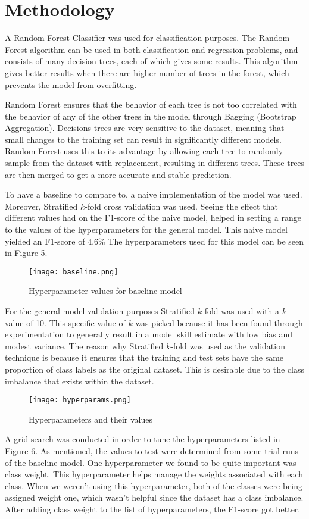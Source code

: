 \documentclass[conference]{IEEEtran}
\begin{document}
\section{Methodology}
A Random Forest Classifier was used for classification purposes. The Random Forest algorithm can be used in both classification and regression problems, and consists of many decision trees, each of which gives some results. This algorithm gives better results when there are higher number of trees in the forest, which prevents the model from overfitting.  

Random Forest ensures that the behavior of each tree is not too correlated with the behavior of any of the other trees in the model through Bagging (Bootstrap Aggregation). Decisions trees are very sensitive to the dataset, meaning that small changes to the training set can result in significantly different models. Random Forest uses this to its advantage by allowing each tree to randomly sample from the dataset with replacement, resulting in different trees. These trees are then merged to get a more accurate and stable prediction.


To have a baseline to compare to, a naive implementation of the model was used. Moreover, Stratified $k$-fold cross validation was used. Seeing the effect that different values had on the F1-score of the naive model, helped in setting a range to the values of the hyperparameters for the general model. This naive model yielded an F1-score of 4.6\% The hyperparameters used for this model can be seen in Figure 5.
\begin{figure}[hbt!]
\centering
\texttt{[image: baseline.png]}
\caption{Hyperparameter values for baseline model\label{overflow}}
\end{figure}


For the general model validation purposes Stratified $k$-fold was used with a $k$ value of 10. This specific value of $k$ was picked because it has been found through experimentation to generally result in a model skill estimate with low bias and modest variance. The reason why Stratified $k$-fold was used as the validation technique is because it ensures that the training and test sets have the same proportion of class labels as the original dataset. This is desirable due to the class imbalance that exists within the dataset.

\begin{figure}[hbt!]
\centering
\texttt{[image: hyperparams.png]}
\caption{Hyperparameters and their values
\label{overflow}}
\end{figure}
A grid search was conducted in order to tune the hyperparameters listed in Figure 6. As mentioned, the values to test were determined from some trial runs of the baseline model. One hyperparameter we found to be quite important was class weight. This hyperparameter helps manage the weights associated with each class. When we weren't using this hyperparameter, both of the classes were being assigned weight one, which wasn't helpful since the dataset has a class imbalance. After adding class weight to the list of hyperparameters, the F1-score got better.
\end{document}
